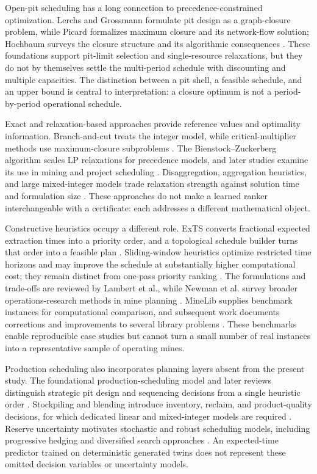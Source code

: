 \documentclass[11pt]{article}
\begin{document}
Open-pit scheduling has a long connection to precedence-constrained optimization. Lerchs and Grossmann formulate pit design as a graph-closure problem, while Picard formalizes maximum closure and its network-flow solution; Hochbaum surveys the closure structure and its algorithmic consequences \cite{lerchs1965,picard1976,hochbaum2004}. These foundations support pit-limit selection and single-resource relaxations, but they do not by themselves settle the multi-period schedule with discounting and multiple capacities. The distinction between a pit shell, a feasible schedule, and an upper bound is central to interpretation: a closure optimum is not a period-by-period operational schedule.

Exact and relaxation-based approaches provide reference values and optimality information. Branch-and-cut treats the integer model, while critical-multiplier methods use maximum-closure subproblems \cite{caccetta2003,chicoisne}. The Bienstock--Zuckerberg algorithm scales LP relaxations for precedence models, and later studies examine its use in mining and project scheduling \cite{bienstock,munoz2017}. Disaggregation, aggregation heuristics, and large mixed-integer models trade relaxation strength against solution time and formulation size \cite{boland2009,jelvez2016,askari2010}. These approaches do not make a learned ranker interchangeable with a certificate: each addresses a different mathematical object.

Constructive heuristics occupy a different role. ExTS converts fractional expected extraction times into a priority order, and a topological schedule builder turns that order into a feasible plan \cite{chicoisne}. Sliding-window heuristics optimize restricted time horizons and may improve the schedule at substantially higher computational cost; they remain distinct from one-pass priority ranking \cite{cullenbine2011}. The formulations and trade-offs are reviewed by Lambert et al., while Newman et al. survey broader operations-research methods in mine planning \cite{lambert2014,newman2010}. MineLib supplies benchmark instances for computational comparison, and subsequent work documents corrections and improvements to several library problems \cite{espinoza2013,jelvez2018}. These benchmarks enable reproducible case studies but cannot turn a small number of real instances into a representative sample of operating mines.

Production scheduling also incorporates planning layers absent from the present study. The foundational production-scheduling model and later reviews distinguish strategic pit design and sequencing decisions from a single heuristic order \cite{johnson1968,meagher2014,bai2018,morales2015}. Stockpiling and blending introduce inventory, reclaim, and product-quality decisions, for which dedicated linear and mixed-integer models are required \cite{moreno2017,rezakhah2020blend,rezakhah2020degrade}. Reserve uncertainty motivates stochastic and robust scheduling models, including progressive hedging and diversified search approaches \cite{ramazan2013,goodfellow2016,lamghari2012,lamghari2016}. An expected-time predictor trained on deterministic generated twins does not represent these omitted decision variables or uncertainty models.
\end{document}
